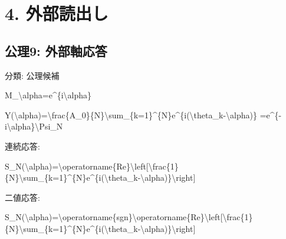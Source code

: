 \documentclass[
  a4paper]{ltjsarticle}
\newenvironment{Shaded}{}{}
\newcommand{\NormalTok}[1]{#1}
\begin{document}
\section{4. 外部読出し}\label{ux5916ux90e8ux8aadux51faux3057}

\subsection{公理9:
外部軸応答}\label{ux516cux74069-ux5916ux90e8ux8ef8ux5fdcux7b54}

分類: 公理候補

\begin{Shaded}
\begin{Highlighting}[]
\NormalTok{M\_\textbackslash{}alpha=e\^{}\{i\textbackslash{}alpha\}}
\end{Highlighting}
\end{Shaded}

\begin{Shaded}
\begin{Highlighting}[]
\NormalTok{Y(\textbackslash{}alpha)=\textbackslash{}frac\{A\_0\}\{N\}\textbackslash{}sum\_\{k=1\}\^{}\{N\}e\^{}\{i(\textbackslash{}theta\_k{-}\textbackslash{}alpha)\}}
\NormalTok{=e\^{}\{{-}i\textbackslash{}alpha\}\textbackslash{}Psi\_N}
\end{Highlighting}
\end{Shaded}

連続応答:

\begin{Shaded}
\begin{Highlighting}[]
\NormalTok{S\_N(\textbackslash{}alpha)=\textbackslash{}operatorname\{Re\}\textbackslash{}left[\textbackslash{}frac\{1\}\{N\}\textbackslash{}sum\_\{k=1\}\^{}\{N\}e\^{}\{i(\textbackslash{}theta\_k{-}\textbackslash{}alpha)\}\textbackslash{}right]}
\end{Highlighting}
\end{Shaded}

二値応答:

\begin{Shaded}
\begin{Highlighting}[]
\NormalTok{S\_N(\textbackslash{}alpha)=\textbackslash{}operatorname\{sgn\}\textbackslash{}operatorname\{Re\}\textbackslash{}left[\textbackslash{}frac\{1\}\{N\}\textbackslash{}sum\_\{k=1\}\^{}\{N\}e\^{}\{i(\textbackslash{}theta\_k{-}\textbackslash{}alpha)\}\textbackslash{}right]}
\end{Highlighting}
\end{Shaded}
\end{document}
